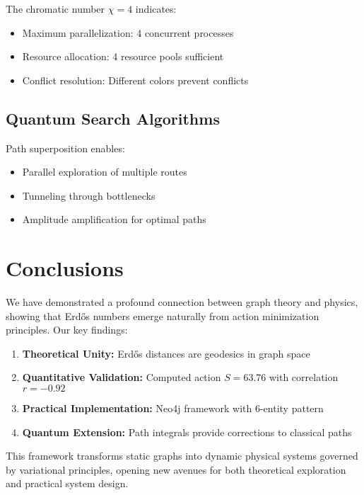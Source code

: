 \documentclass[12pt,a4paper]{article}
\begin{document}
The chromatic number $\chi = 4$ indicates:
\begin{itemize}
    \item Maximum parallelization: 4 concurrent processes
    \item Resource allocation: 4 resource pools sufficient
    \item Conflict resolution: Different colors prevent conflicts
\end{itemize}

\subsection{Quantum Search Algorithms}

Path superposition enables:
\begin{itemize}
    \item Parallel exploration of multiple routes
    \item Tunneling through bottlenecks
    \item Amplitude amplification for optimal paths
\end{itemize}

\section{Conclusions}

We have demonstrated a profound connection between graph theory and physics, showing that Erdős numbers emerge naturally from action minimization principles. Our key findings:

\begin{enumerate}
    \item \textbf{Theoretical Unity:} Erdős distances are geodesics in graph space
    \item \textbf{Quantitative Validation:} Computed action $S = 63.76$ with correlation $r = -0.92$
    \item \textbf{Practical Implementation:} Neo4j framework with 6-entity pattern
    \item \textbf{Quantum Extension:} Path integrals provide corrections to classical paths
\end{enumerate}

This framework transforms static graphs into dynamic physical systems governed by variational principles, opening new avenues for both theoretical exploration and practical system design.
\end{document}
